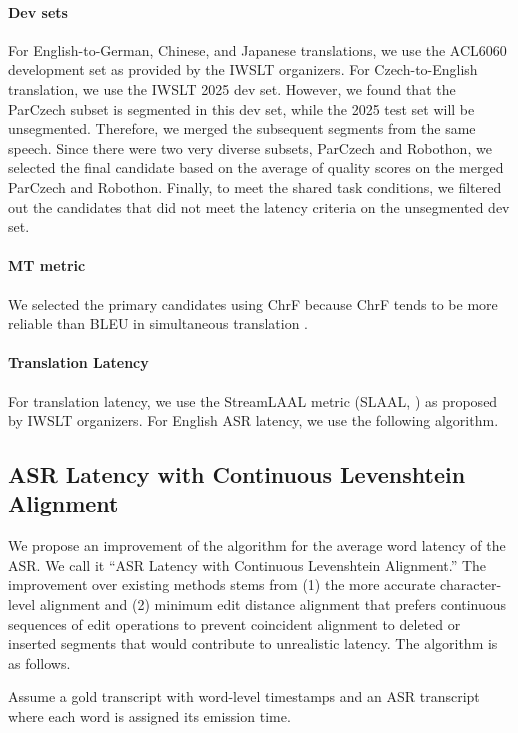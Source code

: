 \documentclass[11pt]{article}
\begin{document}
\paragraph{Dev sets} For English-to-German, Chinese, and Japanese translations, we use the ACL6060 development set as provided by the IWSLT organizers. For Czech-to-English translation, we use the IWSLT 2025 dev set. However, we found that the ParCzech subset is segmented in this dev set, while the 2025 test set will be unsegmented. Therefore, we merged the subsequent segments from the same speech. Since there were two very diverse subsets, ParCzech and Robothon, we selected the final candidate based on the average of quality scores on the merged ParCzech and Robothon. Finally, to meet the shared task conditions, we filtered out the candidates that did not meet the latency criteria on the unsegmented dev set.

\paragraph{MT metric} We selected the primary candidates using ChrF because ChrF tends to be more reliable than BLEU in simultaneous translation \cite{machacek-etal-2023-mt}.


\paragraph{Translation Latency} For translation latency, we use the StreamLAAL metric (SLAAL, \citealp{papi-et-al-2024-streamatt}) as proposed by IWSLT organizers. For English ASR latency, we use the following algorithm.

\subsection{ASR Latency with Continuous Levenshtein Alignment}
\label{sec:latency}

We propose an improvement of the algorithm for the average word latency of the ASR. We call it ``ASR Latency with Continuous Levenshtein Alignment.'' The improvement over existing methods stems from (1) the more accurate character-level alignment and (2) minimum edit distance alignment that prefers continuous sequences of edit operations to prevent coincident alignment to deleted or inserted segments that would contribute to unrealistic latency. The algorithm is as follows.

Assume a gold transcript with word-level timestamps and an ASR transcript where each word is assigned its emission time.
\end{document}
